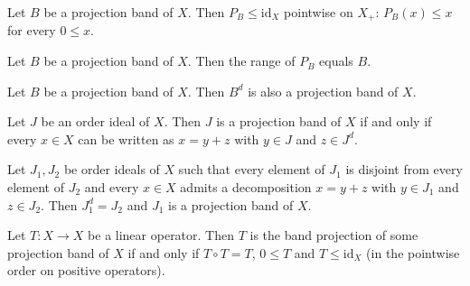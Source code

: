 \begin{lemma}
\label{lem:projectionBand-bandProjection-le-id}
\leanok
{}
Let $B$ be a projection band of $X$. Then $P_B \le \mathrm{id}_X$
pointwise on $X_+$: $P_B(x) \le x$ for every $0 \le x$.
\end{lemma}

\begin{lemma}
\label{lem:projectionBand-range-bandProjection}
\leanok
{}
Let $B$ be a projection band of $X$. Then the range of $P_B$ equals
$B$.
\end{lemma}

\begin{lemma}
\label{lem:projectionBand-disjointComplementProjectionBand}
\leanok
{}
Let $B$ be a projection band of $X$. Then $B^d$ is also a projection
band of $X$.
\end{lemma}

\begin{theorem}
\label{thm:projectionBand-iff-add-disjointComplement}
\leanok
{}
Let $J$ be an order ideal of $X$. Then $J$ is a projection band of
$X$ if and only if every $x \in X$ can be written as $x = y + z$ with
$y \in J$ and $z \in J^d$.
\end{theorem}

\begin{theorem}
\label{thm:projectionBand-of-direct-sum-of-disjoint}
\leanok
{}
Let $J_1, J_2$ be order ideals of $X$ such that every element of
$J_1$ is disjoint from every element of $J_2$ and every $x \in X$
admits a decomposition $x = y + z$ with $y \in J_1$ and $z \in J_2$.
Then $J_1^d = J_2$ and $J_1$ is a projection band of $X$.
\end{theorem}

\begin{theorem}
\label{thm:projectionBand-bandProjection-iff}
\leanok
{}
Let $T \colon X \to X$ be a linear operator. Then $T$ is the band
projection of some projection band of $X$ if and only if $T \circ T =
T$, $0 \le T$ and $T \le \mathrm{id}_X$ (in the pointwise order on
positive operators).
\end{theorem}

